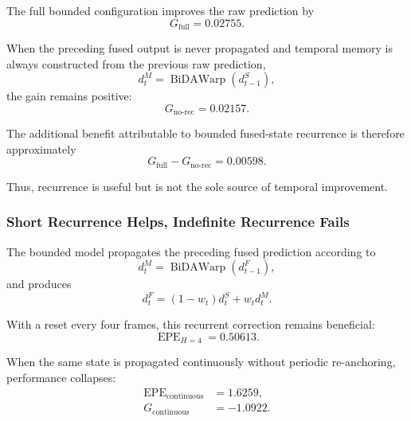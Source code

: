 \documentclass[11pt,a4paper]{article}
\begin{document}
The full bounded configuration improves the raw prediction by
\begin{equation}
    G_{\mathrm{full}}
    =
    0.02755.
\end{equation}

When the preceding fused output is never propagated and temporal memory is always
constructed from the previous raw prediction,
\begin{equation}
    d_t^{M}
    =
    \operatorname{BiDAWarp}
    \left(
        d_{t-1}^{S}
    \right),
\end{equation}
the gain remains positive:
\begin{equation}
    G_{\mathrm{no\text{-}rec}}
    =
    0.02157.
\end{equation}

The additional benefit attributable to bounded fused-state recurrence is therefore
approximately
\begin{equation}
    G_{\mathrm{full}}
    -
    G_{\mathrm{no\text{-}rec}}
    =
    0.00598.
    \label{eq:bounded_recurrence_gain}
\end{equation}

Thus, recurrence is useful but is not the sole source of temporal improvement.

\subsubsection{Short Recurrence Helps, Indefinite Recurrence Fails}

The bounded model propagates the preceding fused prediction according to
\begin{equation}
    d_t^{M}
    =
    \operatorname{BiDAWarp}
    \left(
        d_{t-1}^{F}
    \right),
\end{equation}
and produces
\begin{equation}
    d_t^{F}
    =
    \left(1-w_t\right)d_t^{S}
    +
    w_t d_t^{M}.
    \label{eq:bounded_soft_fusion}
\end{equation}

With a reset every four frames, this recurrent correction remains beneficial:
\begin{equation}
    \operatorname{EPE}_{H=4}
    =
    0.50613.
\end{equation}

When the same state is propagated continuously without periodic re-anchoring, performance
collapses:
\begin{align}
    \operatorname{EPE}_{\mathrm{continuous}}
    &= 1.6259,\\
    G_{\mathrm{continuous}}
    &= -1.0922.
\end{align}
\end{document}
